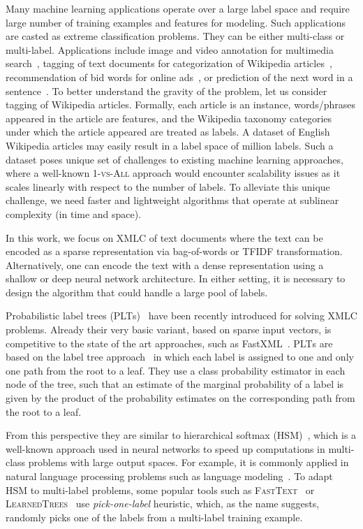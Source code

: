 \documentclass{article}
\newcommand{\Algo}[1]{\textsc{#1}}
\begin{document}
Many machine learning applications operate over a large label space
and require large number of training examples and features for
modeling. Such applications are casted as extreme %
classification problems. They can be either multi-class or
multi-label. Applications include image and video
annotation for multimedia search~\citep{Deng_et_al_2011}, tagging of text documents for categorization of Wikipedia articles~\citep{Dekel_Shamir_2010}, recommendation of bid
words for online ads~\citep{Prabhu_Varma_2014}, or prediction of the
next word in a sentence~\citep{Mikolov_et_al_2013}.
%
To better understand the gravity of the problem, let us consider
tagging of Wikipedia articles. Formally, each article is an instance,
words/phrases appeared in the article are features, and the Wikipedia
taxonomy categories under which the article appeared are treated as
labels. A dataset of English Wikipedia articles may easily result in a
label space of million labels. Such a dataset poses unique set of
challenges to existing machine learning approaches, where a well-known
\Algo{1-vs-All} approach would encounter scalability issues as it
scales linearly with respect to the number of labels.  To alleviate this
unique challenge, we need faster and lightweight algorithms that
operate at sublinear complexity (in time and space).

In this work, we focus on XMLC of text documents where the text can be
encoded as a sparse representation via bag-of-words or TFIDF
transformation. Alternatively, one can encode the text with a dense
representation using a shallow or deep neural network architecture.
In either setting, it is necessary to design the algorithm that could
handle a large pool of labels.
%

Probabilistic label trees (\Algo{PLT}s)~\citep{Jasinska_et_al_2016}
have been recently introduced for solving XMLC problems. Already their
very basic variant, based on sparse input vectors, is competitive to
the state of the art approaches, such as FastXML~\citep{Prabhu_Varma_2014}. 
\Algo{PLT}s are based on the label tree
approach~\cite{Beygelzimer_et_al_2009a,Bengio_et_al_2010,Deng_et_al_2011}
in which each label is assigned to one and only one path from the root
to a leaf. 
They use a class probability estimator in each node of the tree, 
such that an estimate of the marginal probability of a label is given by 
the product of the probability estimates on the corresponding path 
from the root to a leaf. 

From this perspective they are similar to hierarchical softmax (\Algo{HSM})~\citep{Morin_Bengio_2005},
which is a well-known approach used in
neural networks to speed up computations in multi-class problems with
large output spaces. For example, it is commonly applied in natural
language processing problems such as language
modeling~\citep{Mikolov_et_al_2013}. To adapt \Algo{HSM} to multi-label problems, 
some popular tools such as \Algo{FastText}~\citep{Joulin_et_al_2016} or
\Algo{LearnedTrees}~\citep{Jernite_et_al_2017} use \emph{pick-one-label} heuristic, 
which, as the name suggests, randomly picks one of the labels from a multi-label training example. 
\end{document}
